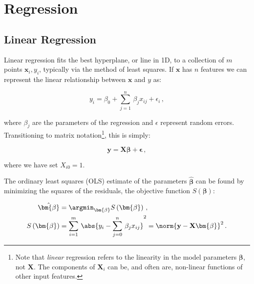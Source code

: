 \chapter{Regression}
\label{chap:regression}

\section{Linear Regression}
\label{regression:linear}

Linear regression fits the best hyperplane, or line in 1D,
to a collection of $m$ points $\mathbf{x}_{i}, y_{i}$,
typically via the method of least squares.
If $\mathbf{x}$ has $n$ features we can represent the
linear relationship between $\mathbf{x}$ and $y$ as:

\begin{equation}\label{eq:linear:onepoint}
y_{i} = \beta_{0} + \sum_{j=1}^{n}\, \beta_{j} x_{ij} + \epsilon_{i}\,,
\end{equation}

\noindent where $\beta_{j}$ are the parameters of the regression
and $\epsilon$ represent random errors.
Transitioning to matrix notation\footnote{Note
that \textit{linear} regression refers to the linearity in the model parameters
$\bm{\beta}$, not $\mathbf{X}$.
The components of $\mathbf{X}_{i}$ can be, and often are,
non-linear functions of other input features.}, this is simply:

\begin{equation}\label{eq:linear:matrix}
\mathbf{y} = \mathbf{X} \bm{\beta} + \bm{\epsilon}\,,
\end{equation}

\noindent where we have set $X_{i0} =1$.

The ordinary least squares (OLS) estimate of the parameters $\hat{\bm{\beta}}$
can be found by minimizing the squares of the residuals,
\ie the objective function $S\left(\bm{\beta}\right)$:

\begin{subequations} \label{eq:linear:ols}
\begin{align}
\hat{\bm{\beta}} &= \argmin_{\bm{\beta}} S\left(\bm{\beta}\right)\,, \label{eq:linear:argmin} \\
S\left(\bm{\beta}\right) &= \sum_{i=1}^{m} \, \abs{y_{i} - \sum_{j=0}^{n} \, \beta_{j} x_{ij}}^{2} = \norm{\mathbf{y} - \mathbf{X} \bm{\beta}}^{2}\,. \label{eq:linear:S}
\end{align}
\end{subequations}

